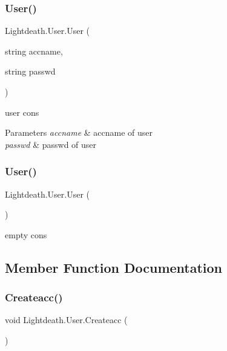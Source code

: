 \subsubsection{\texorpdfstring{User()}{User()}\hspace{0.1cm}{\footnotesize\ttfamily [1/2]}}
{\footnotesize\ttfamily Lightdeath.\+User.\+User (\begin{DoxyParamCaption}\item[{string}]{accname,  }\item[{string}]{passwd }\end{DoxyParamCaption})\hspace{0.3cm}{\ttfamily [inline]}}



user cons 


\begin{DoxyParams}{Parameters}
{\em accname} & accname of user\\
\hline
{\em passwd} & passwd of user\\
\hline
\end{DoxyParams}
\hypertarget{class_lightdeath_1_1_user_ab460f485baaef386d0d7e6c579d7bf75}{}\label{class_lightdeath_1_1_user_ab460f485baaef386d0d7e6c579d7bf75} 
\subsubsection{\texorpdfstring{User()}{User()}\hspace{0.1cm}{\footnotesize\ttfamily [2/2]}}
{\footnotesize\ttfamily Lightdeath.\+User.\+User (\begin{DoxyParamCaption}{ }\end{DoxyParamCaption})\hspace{0.3cm}{\ttfamily [inline]}}



empty cons 



\subsection{Member Function Documentation}
\hypertarget{class_lightdeath_1_1_user_ac77fa197be642fc86594156f1b4674ce}{}\label{class_lightdeath_1_1_user_ac77fa197be642fc86594156f1b4674ce} 
\subsubsection{\texorpdfstring{Createacc()}{Createacc()}}
{\footnotesize\ttfamily void Lightdeath.\+User.\+Createacc (\begin{DoxyParamCaption}{ }\end{DoxyParamCaption})\hspace{0.3cm}{\ttfamily [inline]}}



